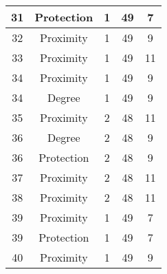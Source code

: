\documentclass[results.tex]{subfiles}
\begin{document}
\begin{center}
\begin{tabular}{| c || c | c | c | c |}
            \hline
            31                      & Protection                   & 1                      & 49                      & 7                    \\
            \hline
            32                      & Proximity                    & 1                      & 49                      & 9                    \\
            \hline
            33                      & Proximity                    & 1                      & 49                      & 11                   \\
            \hline
            34                      & Proximity                    & 1                      & 49                      & 9                    \\
            \hline
            34                      & Degree                       & 1                      & 49                      & 9                    \\
            \hline
            35                      & Proximity                    & 2                      & 48                      & 11                   \\
            \hline
            36                      & Degree                       & 2                      & 48                      & 9                    \\
            \hline
            36                      & Protection                   & 2                      & 48                      & 9                    \\
            \hline
            37                      & Proximity                    & 2                      & 48                      & 11                   \\
            \hline
            38                      & Proximity                    & 2                      & 48                      & 11                   \\
            \hline
            39                      & Proximity                    & 1                      & 49                      & 7                    \\
            \hline
            39                      & Protection                   & 1                      & 49                      & 7                    \\
            \hline
            40                      & Proximity                    & 1                      & 49                      & 9                    \\

\end{tabular}
\end{center}
\end{document}
